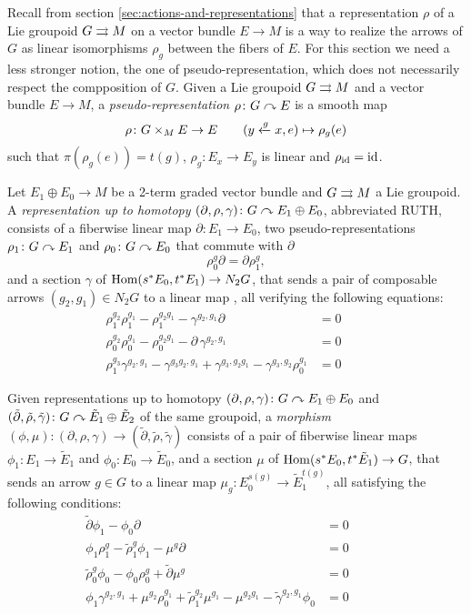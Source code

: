 %
%

Recall from section \ref{sec:actions-and-representations} that a representation $\rho$ of a Lie groupoid $G\rightrightarrows M$ on a vector bundle $E\to M$ is a way to realize the arrows of $G$ as linear isomorphisms $\rho_g$ between the fibers of $E$.
For this section we need a less stronger notion, the one of pseudo-representation, which does not necessarily respect the compposition of $G$.
Given a Lie groupoid $G\rightrightarrows M$ and a vector bundle $E\to M$, a \emph{pseudo-representation} $\rho\colon G\curvearrowright E$ is
a smooth map
\[ \rho\colon G\times_M E\to E \qquad (y\xleftarrow{g}x, e)\mapsto \rho_g(e) \]
such that $\pi(\rho_g(e)) = t(g)$, $\rho_g\colon E_x\to E_y$ is linear and $\rho_{\operatorname{id}}=\operatorname{id}$.

Let $E_1\oplus E_0\to M$ be a 2-term graded vector bundle and $G\rightrightarrows M$ a Lie groupoid.
A \emph{representation up to homotopy} $(\partial, \rho, \gamma)\colon G\curvearrowright E_1\oplus E_0$, abbreviated RUTH, consists of a fiberwise linear map $\partial\colon E_1\to E_0$, two pseudo-representations $\rho_1\colon G\curvearrowright E_1$ and $\rho_0\colon G\curvearrowright E_0$ that commute with $\partial$
$$ \rho_0^g \partial = \partial\rho_1^g , $$
and a section $\gamma$ of $\operatorname{Hom}(s^*E_0, t^*E_1) \to N_2G$, that sends a pair of composable arrows $(g_2, g_1)\in N_2G$ to a linear map , all verifying the following equations:
\begin{align}
  \rho_1^{g_2}\rho_1^{g_1} - \rho_1^{g_2g_1} - \gamma^{g_2, g_1}\partial &= 0 \\
  \rho_0^{g_2}\rho_0^{g_1} - \rho_0^{g_2g_1} - \partial\,\gamma^{g_2, g_1} &= 0 \\
  \rho_1^{g_3}\gamma^{g_2, g_1} - \gamma^{g_3g_2, g_1} + \gamma^{g_3, g_2g_1} - \gamma^{g_3, g_2}\rho_0^{g_1} &=0 \qquad
\end{align}

Given representations up to homotopy $(\partial, \rho, \gamma)\colon G\curvearrowright E_1\oplus E_0$ and $(\tilde\partial, \tilde\rho, \tilde\gamma)\colon G\curvearrowright \tilde E_1\oplus \tilde E_2$ of the same groupoid, a \emph{morphism} $(\phi, \mu)\colon(\partial, \rho, \gamma)\to(\tilde\partial, \tilde\rho, \tilde\gamma)$ consists of a pair of fiberwise linear maps $\phi_1\colon E_1\to \tilde E_1$ and $\phi_0\colon E_0\to \tilde E_0$, and a section $\mu$ of $\operatorname{Hom}(s^*E_0, t^*\tilde E_1) \to G$, that sends an arrow $g\in G$ to a linear map $\mu_g\colon E_0^{s(g)}\to \tilde E_1^{t(g)}$, all satisfying the following conditions:
\begin{align}
  \tilde\partial\phi_1 - \phi_0\partial &= 0 \\
  \phi_1\rho_1^g - \tilde\rho_1^g\phi_1 - \mu^g\partial &= 0 \\
  \tilde\rho_0^g\phi_0 - \phi_0\rho_0^g + \tilde\partial\mu^g &= 0 \\
  \phi_1\gamma^{g_2, g_1} + \mu^{g_2}\rho_0^{g_1} + \tilde\rho_1^{g_2}\mu^{g_1} - \mu^{g_2g_1} - \tilde\gamma^{g_2, g_1}\phi_0 &= 0 \qquad\quad
\end{align}

